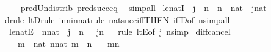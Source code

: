 \begin{isabellebody}
%
\isadelimproof
\ \ %
\endisadelimproof
%
\isatagproof
{}\isamarkupfalse%
\ pred{\isacharunderscore}{\kern0pt}Un{\isacharunderscore}{\kern0pt}distrib\ pred{\isacharunderscore}{\kern0pt}succ{\isacharunderscore}{\kern0pt}eq\ \isamarkupfalse%
\ simp{\isacharunderscore}{\kern0pt}all%
\endisatagproof
{\isafoldproof}%
%
\isadelimproof
\isanewline
%
\endisadelimproof
\isanewline
{}\isamarkupfalse%
\ le{\isacharunderscore}{\kern0pt}natI\ {\isacharcolon}{\kern0pt}\ {\isachardoublequoteopen}j\ {\isasymle}\ n\ {\isasymLongrightarrow}\ n\ {\isasymin}\ nat\ {\isasymLongrightarrow}\ j{\isasymin}nat{\isachardoublequoteclose}\isanewline
%
\isadelimproof
\ \ %
\endisadelimproof
%
\isatagproof
{}\isamarkupfalse%
{\isacharparenleft}{\kern0pt}drule\ ltD{\isacharcomma}{\kern0pt}rule\ in{\isacharunderscore}{\kern0pt}n{\isacharunderscore}{\kern0pt}in{\isacharunderscore}{\kern0pt}nat{\isacharcomma}{\kern0pt}rule\ nat{\isacharunderscore}{\kern0pt}succ{\isacharunderscore}{\kern0pt}iff{\isacharbrackleft}{\kern0pt}THEN\ iffD{}{\isacharcomma}{\kern0pt}of\ n{\isacharbrackright}{\kern0pt}{\isacharcomma}{\kern0pt}simp{\isacharunderscore}{\kern0pt}all{\isacharparenright}{\kern0pt}%
\endisatagproof
{\isafoldproof}%
%
\isadelimproof
\isanewline
%
\endisadelimproof
\isanewline
{}\isamarkupfalse%
\ le{\isacharunderscore}{\kern0pt}natE\ {\isacharcolon}{\kern0pt}\ {\isachardoublequoteopen}n{\isasymin}nat\ {\isasymLongrightarrow}\ j\ {\isacharless}{\kern0pt}\ n\ {\isasymLongrightarrow}\ \ j{\isasymin}n{\isachardoublequoteclose}\isanewline
%
\isadelimproof
\ \ %
\endisadelimproof
%
\isatagproof
{}\isamarkupfalse%
{\isacharparenleft}{\kern0pt}rule\ ltE{\isacharbrackleft}{\kern0pt}of\ j\ n{\isacharbrackright}{\kern0pt}{\isacharcomma}{\kern0pt}simp{\isacharplus}{\kern0pt}{\isacharparenright}{\kern0pt}%
\endisatagproof
{\isafoldproof}%
%
\isadelimproof
\isanewline
%
\endisadelimproof
\isanewline
{}\isamarkupfalse%
\ diff{\isacharunderscore}{\kern0pt}cancel\ {\isacharcolon}{\kern0pt}\isanewline
\ \ \ {\isachardoublequoteopen}m\ {\isasymin}\ nat{\isachardoublequoteclose}\ {\isachardoublequoteopen}n{\isasymin}nat{\isachardoublequoteclose}\ {\isachardoublequoteopen}m\ {\isacharless}{\kern0pt}\ n{\isachardoublequoteclose}\isanewline
\ \ \ {\isachardoublequoteopen}m{\isacharhash}{\kern0pt}{\isacharminus}{\kern0pt}n\ {\isacharequal}{\kern0pt}\ {}{\isachardoublequoteclose}\isanewline
%
\isadelimproof
\ \ %
\endisadelimproof
%
\isatagproof
{}\isamarkupfalse%

\end{isabellebody}
